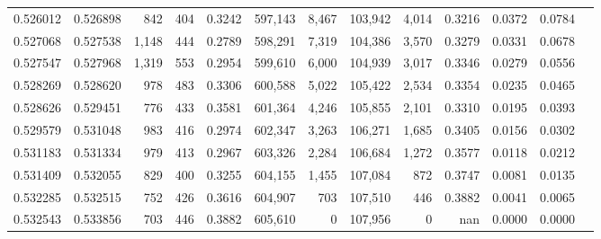 \begin{tabular}{rrrrrrrrrrrrr}
0.526012 & 0.526898 &   842 &   404 &                                     0.3242 & 597,143 &   8,467 & 103,942 &   4,014 & 0.3216 & 0.0372 & 0.0784 \\
0.527068 & 0.527538 & 1,148 &   444 &                                     0.2789 & 598,291 &   7,319 & 104,386 &   3,570 & 0.3279 & 0.0331 & 0.0678 \\
0.527547 & 0.527968 & 1,319 &   553 &                                     0.2954 & 599,610 &   6,000 & 104,939 &   3,017 & 0.3346 & 0.0279 & 0.0556 \\
0.528269 & 0.528620 &   978 &   483 &                                     0.3306 & 600,588 &   5,022 & 105,422 &   2,534 & 0.3354 & 0.0235 & 0.0465 \\
0.528626 & 0.529451 &   776 &   433 &                                     0.3581 & 601,364 &   4,246 & 105,855 &   2,101 & 0.3310 & 0.0195 & 0.0393 \\
0.529579 & 0.531048 &   983 &   416 &                                     0.2974 & 602,347 &   3,263 & 106,271 &   1,685 & 0.3405 & 0.0156 & 0.0302 \\
0.531183 & 0.531334 &   979 &   413 &                                     0.2967 & 603,326 &   2,284 & 106,684 &   1,272 & 0.3577 & 0.0118 & 0.0212 \\
0.531409 & 0.532055 &   829 &   400 &                                     0.3255 & 604,155 &   1,455 & 107,084 &     872 & 0.3747 & 0.0081 & 0.0135 \\
0.532285 & 0.532515 &   752 &   426 &                                     0.3616 & 604,907 &     703 & 107,510 &     446 & 0.3882 & 0.0041 & 0.0065 \\
0.532543 & 0.533856 &   703 &   446 &                                     0.3882 & 605,610 &       0 & 107,956 &       0 &    nan & 0.0000 & 0.0000 \\
\bottomrule
\end{tabular}
